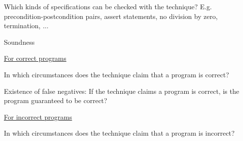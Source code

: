 \documentclass[a4paper]{article}
\begin{document}
\begin{minipage}[t]{0.16\linewidth}
\begin{betterlist}
{{\begin{betterlist}
				\end{betterlist}
			}}
		\item Which kinds of specifications can be checked with the technique? E.g. precondition-postcondition pairs, assert statements, no division by zero, termination, ...

		\item \alert{Soundness}
		\begin{betterlist}
			\item \underline{For correct programs}
			\begin{betterlist}
				\item In which circumstances does the technique claim that a program is correct?

				\item Existence of false negatives: If the technique claims a program is correct, is the program guaranteed to be correct?

			\end{betterlist}
			\item \underline{For incorrect programs}
			\begin{betterlist}
				\item In which circumstances does the technique claim that a program is incorrect?


\end{betterlist}
\end{betterlist}
\end{betterlist}
\end{minipage}
\end{document}
